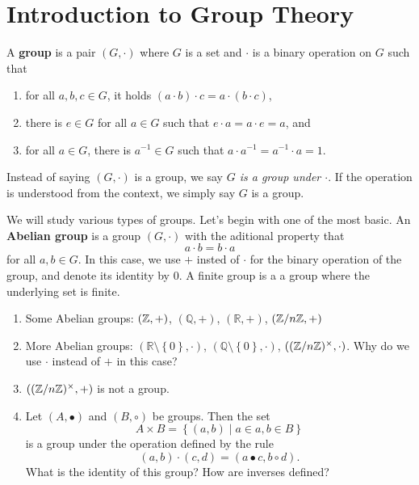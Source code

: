 \documentclass[11pt,a4paper]{article}
\begin{document}
\def\contador{Lesson 3}


\section{Introduction to Group Theory}

\begin{defi}
    A \textbf{group} is a pair  \(\left( G, \cdot \right)\) where \(G\) is a set and \(\cdot\) is a binary  operation on \(G\) such that 
    \begin{enumerate}[label=(\roman*)]
        \item for all \(a,b,c\in G\), it holds  \((a\cdot b) \cdot c = a \cdot (b\cdot c) \),
        \item there is \(e\in G\)  for all \(a\in G\) such that \(e\cdot a = a\cdot e = a\), and 
        \item for all \(a\in G\), there is \(a^{-1}\in G\) such that \(a\cdot a^{-1} = a^{-1}\cdot a = 1\).
    \end{enumerate}
\end{defi}


Instead of saying \((G,\cdot)\) is a group, we say \textit{\(G\) is a group under \(\cdot\)}.
If the operation is understood from the context, we simply say \(G\) is a group.


We will study various types of groups.
Let's begin with one of the most basic.
An \textbf{Abelian group} is a group \(\left( G, \cdot \right)\) with the aditional property that 
\[a\cdot b = b\cdot a \]
for all \(a,b\in G\).
In this case, we use \(+\) insted of \(\cdot\) for the binary operation of the group, and denote its identity by \(0\).
A finite group is a a group where the underlying set is finite.

\begin{exa}
\begin{enumerate}[label=(\roman*)]
    \item Some Abelian groups: \(\left( \mathbb{Z}, + \right)\), \(\left( \mathbb{Q}, + \right)\), \(\left( \mathbb{R}, + \right)\),   \(\left( \mathbb{Z}/n\mathbb{Z} , +\right)\)
    \item More Abelian groups: \(\left( \mathbb{R}\setminus\left\{ 0 \right\}, \cdot \right)\), \(\left( \mathbb{Q}\setminus\left\{ 0 \right\}, \cdot \right)\), \(\left( (\mathbb{Z}/n\mathbb{Z})^\times , \cdot\right)\). Why do we  use \(\cdot\) instead of \(+\) in this case?
    
    \item \(\left( (\mathbb{Z}/n\mathbb{Z})^\times , +\right)\) is not a group.
    \item Let \((A, \bullet)\) and \((B, \circ)\) be groups.
    Then the set 
    \[A\times B = \left\{ (a,b)\mid a\in a, b\in B \right\}\]
    is a group under the operation defined by the rule 
    \[(a,b)\cdot(c,d)  = (a\bullet c, b\circ d).\]
    What is the identity of this group? How are inverses defined?
\end{enumerate}
\end{exa}
\end{document}

